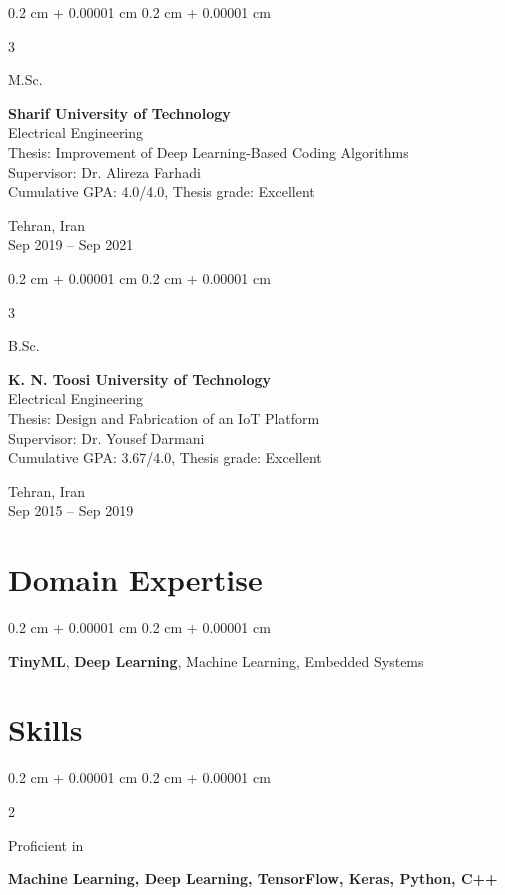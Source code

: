 \documentclass[10pt, letterpaper]{article}
\newenvironment{onecolentry}{
    \begin{adjustwidth}{
        0.2 cm + 0.00001 cm
    }{
        0.2 cm + 0.00001 cm
    }
}{
    \end{adjustwidth}
} %
\newenvironment{twocolentryleftfixed}[1]{
    \onecolentry
    \def\firstColumn{#1}
    \setcolumnwidth{2.5cm, \fill}
    \begin{paracol}{2}
    {\raggedright \firstColumn} \switchcolumn
}{
    \end{paracol}
    \endonecolentry
} %
\newenvironment{threecolentry}[3][]{
    \onecolentry
    \def\thirdColumn{#3}
    \setcolumnwidth{1 cm, \fill, 4.5 cm}
    \begin{paracol}{3}
    {\raggedright #2} \switchcolumn
}{
    \switchcolumn \raggedleft \thirdColumn
    \end{paracol}
    \endonecolentry
} %
\begin{document}
        \vspace{0.2 cm}
        
        \begin{threecolentry}{M.Sc.}{
            Tehran, Iran\\
            Sep 2019 – Sep 2021
        }
            \textbf{Sharif University of Technology}\\
            Electrical Engineering\\
            Thesis: Improvement of Deep Learning-Based Coding Algorithms\\
            Supervisor: Dr. Alireza Farhadi\\
            Cumulative GPA: 4.0/4.0, Thesis grade: Excellent
        \end{threecolentry}
        
        \vspace{0.2 cm}
        
        \begin{threecolentry}{B.Sc.}{
            Tehran, Iran\\
            Sep 2015 – Sep 2019
        }
            \textbf{K. N. Toosi University of Technology}\\
            Electrical Engineering\\
            Thesis: Design and Fabrication of an IoT Platform\\
            Supervisor: Dr. Yousef Darmani\\
            Cumulative GPA: 3.67/4.0, Thesis grade: Excellent
        \end{threecolentry}


    \section{Domain Expertise}
        \begin{onecolentry}
            \textbf{TinyML}, \textbf{Deep Learning}, Machine Learning, Embedded Systems
        \end{onecolentry}


    \section{Skills}
        
        \begin{twocolentryleftfixed}{Proficient in}
            \textbf{Machine Learning, Deep Learning, TensorFlow, Keras, Python, C++}
        \end{twocolentryleftfixed}
        
\end{document}

